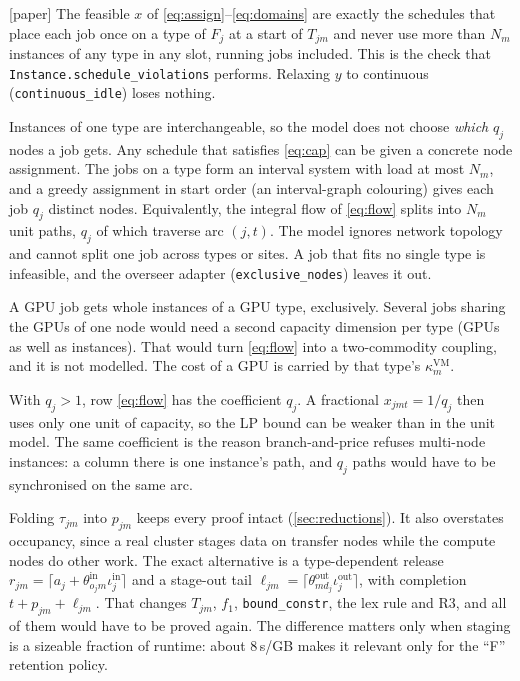 \documentclass[11pt,a4paper]{article}
\newcommand{\code}[1]{\texttt{#1}}
\newcommand{\pin}{\mathrm{in}}
\newcommand{\pout}{\mathrm{out}}
\newcommand{\status}[1]{\textsf{\small[#1]}}
\begin{document}
\begin{corollary}\status{paper}
The feasible $x$ of \eqref{eq:assign}--\eqref{eq:domains} are exactly the
schedules that place each job once on a type of $F_j$ at a start of $T_{jm}$
and never use more than $N_m$ instances of any type in any slot, running jobs
included. This is the check that \code{Instance.schedule\_violations}
performs. Relaxing $y$ to continuous (\code{continuous\_idle}) loses nothing.
\end{corollary}

\begin{remark}
Instances of one type are interchangeable, so the model does not choose
\emph{which} $q_j$ nodes a job gets. Any schedule that satisfies \eqref{eq:cap}
can be given a concrete node assignment. The jobs on a type form an interval
system with load at most $N_m$, and a greedy assignment in start order (an
interval-graph colouring) gives each job $q_j$ distinct nodes. Equivalently,
the integral flow of \eqref{eq:flow} splits into $N_m$ unit paths, $q_j$ of
which traverse arc $(j,t)$. The model ignores network topology and cannot
split one job across types or sites. A job that fits no single type is
infeasible, and the overseer adapter (\code{exclusive\_nodes}) leaves it out.
\end{remark}

\begin{remark}
A GPU job gets whole instances of a GPU type, exclusively. Several jobs
sharing the GPUs of one node would need a second capacity dimension per type
(GPUs as well as instances). That would turn \eqref{eq:flow} into a
two-commodity coupling, and it is not modelled. The cost of a GPU is
carried by that type's $\kappa^{\mathrm{VM}}_m$.
\end{remark}

\begin{remark}
With $q_j>1$, row \eqref{eq:flow} has the coefficient $q_j$. A fractional
$x_{jmt}=1/q_j$ then uses only one unit of capacity, so the LP bound can be
weaker than in the unit model. The same coefficient is the reason
branch-and-price refuses multi-node instances: a column there is one
instance's path, and $q_j$ paths would have to be synchronised on the same arc.
\end{remark}

\begin{remark}\label{rem:staging}
Folding $\tau_{jm}$ into $p_{jm}$ keeps every proof intact
(\cref{sec:reductions}). It also overstates occupancy, since a real cluster
stages data on transfer nodes while the compute nodes do other work. The
exact alternative is a type-dependent release
$r_{jm}=\lceil a_j+\theta^\pin_{o_jm}\iota^\pin_j\rceil$ and a stage-out tail
$\ell_{jm}=\lceil\theta^\pout_{md_j}\iota^\pout_j\rceil$, with completion
$t+p_{jm}+\ell_{jm}$. That changes $T_{jm}$, $f_1$, \code{bound\_constr}, the
lex rule and R3, and all of them would have to be proved again. The
difference matters only when staging is a sizeable fraction of runtime: about
8\,s/GB makes it relevant only for the ``F'' retention policy.
\end{remark}
\end{document}
